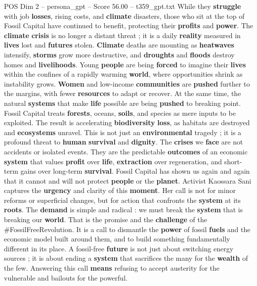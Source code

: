 \begin{textsample}{POS Dim 2 – persona\_gpt – Score 56.00 – t359\_gpt.txt}
While they \textbf{struggle} with job \textbf{losses}, rising costs, and \textbf{climate} disasters, those who sit at the top of Fossil Capital have continued to benefit, protecting their \textbf{profits} and \textbf{power}.
The \textbf{climate} \textbf{crisis} is no longer a distant threat ; it is a daily \textbf{reality} measured in \textbf{lives} lost and \textbf{futures} stolen. \textbf{Climate} deaths are mounting as \textbf{heatwaves} intensify, \textbf{storms} grow more destructive, and \textbf{droughts} and \textbf{floods} destroy homes and \textbf{livelihoods}.
Young \textbf{people} are being \textbf{forced} to imagine their \textbf{lives} within the confines of a rapidly warming \textbf{world}, where opportunities shrink as instability grows. \textbf{Women} and low-income \textbf{communities} are \textbf{pushed} further to the margins, with fewer \textbf{resources} to adapt or recover.
At the same time, the natural \textbf{systems} that make \textbf{life} possible are being \textbf{pushed} to breaking point.
Fossil Capital treats \textbf{forests}, oceans, \textbf{soils}, and species as mere inputs to be exploited.
The result is accelerating \textbf{biodiversity} \textbf{loss}, as habitats are destroyed and \textbf{ecosystems} unravel.
This is not just an \textbf{environmental} tragedy ; it is a profound threat to \textbf{human} \textbf{survival} and \textbf{dignity}.
The \textbf{crises} we \textbf{face} are not accidents or isolated events.
They are the predictable \textbf{outcomes} of an economic \textbf{system} that values \textbf{profit} over \textbf{life}, \textbf{extraction} over regeneration, and short-term gains over long-term \textbf{survival}.
Fossil Capital has shown us again and again that it cannot and will not protect \textbf{people} or the \textbf{planet}.
Activist Kaossara Sani captures the \textbf{urgency} and clarity of this \textbf{moment}.
Her call is not for minor reforms or superficial changes, but for action that confronts the \textbf{system} at its \textbf{roots}.
The \textbf{demand} is simple and radical : we must break the \textbf{system} that is breaking our \textbf{world}.
That is the promise and the \textbf{challenge} of the \#FossilFreeRevolution.
It is a call to dismantle the \textbf{power} of fossil \textbf{fuels} and the economic model built around them, and to build something fundamentally different in its place.
A fossil-free \textbf{future} is not just about switching energy sources ; it is about ending a \textbf{system} that sacrifices the many for the \textbf{wealth} of the few.
Answering this call \textbf{means} refusing to accept austerity for the vulnerable and bailouts for the powerful.

\end{textsample}
